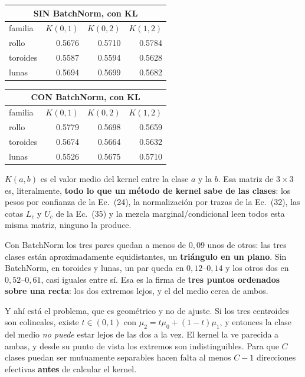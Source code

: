 \documentclass[11pt,a4paper]{article}
\begin{document}
\noindent
\begin{minipage}[t]{0.49\textwidth}
  \centering
  \footnotesize\setlength{\tabcolsep}{3pt}
  \begin{tabular}{lrrr}
      \multicolumn{4}{c}{\textbf{SIN BatchNorm, con KL}} \\[2pt]
      \toprule
      familia & $K(0,1)$ & $K(0,2)$ & $K(1,2)$ \\
      \midrule
      rollo & 0.5676 & 0.5710 & 0.5784 \\
      toroides & 0.5587 & 0.5594 & 0.5628 \\
      lunas & 0.5694 & 0.5699 & 0.5682 \\
      \bottomrule
    \end{tabular}
\end{minipage}\hfill
\begin{minipage}[t]{0.49\textwidth}
  \centering
  \footnotesize\setlength{\tabcolsep}{3pt}
  \begin{tabular}{lrrr}
      \multicolumn{4}{c}{\textbf{CON BatchNorm, con KL}} \\[2pt]
      \toprule
      familia & $K(0,1)$ & $K(0,2)$ & $K(1,2)$ \\
      \midrule
      rollo & 0.5779 & 0.5698 & 0.5659 \\
      toroides & 0.5674 & 0.5664 & 0.5632 \\
      lunas & 0.5526 & 0.5675 & 0.5710 \\
      \bottomrule
    \end{tabular}
\end{minipage}
\vspace{11pt}


$K(a,b)$ es el valor medio del kernel entre la clase $a$ y la $b$. Esa matriz de
$3\times 3$ es, literalmente, \textbf{todo lo que un método de kernel sabe de las
clases}: los pesos por confianza de la Ec.~(24), la normalización por trazas de la
Ec.~(32), las cotas $L_c$ y $U_c$ de la Ec.~(35) y la mezcla marginal/condicional
leen todos esta misma matriz, ninguno la produce.

Con BatchNorm los tres pares quedan a menos de $0{,}09$ unos de otros: las tres
clases están aproximadamente equidistantes, un \textbf{triángulo en un plano}. Sin
BatchNorm, en toroides y lunas, un par queda en $0{,}12$--$0{,}14$ y los otros dos
en $0{,}52$--$0{,}61$, casi iguales entre sí. Esa es la firma de \textbf{tres
puntos ordenados sobre una recta}: los dos extremos lejos, y el del medio cerca de
ambos.

Y ahí está el problema, que es geométrico y no de ajuste. Si los tres centroides
son colineales, existe $t \in (0,1)$ con $\mu_2 = t\mu_0 + (1-t)\mu_1$, y entonces
la clase del medio \emph{no puede} estar lejos de las dos a la vez. El kernel la ve
parecida a ambas, y desde su punto de vista los extremos son indistinguibles. Para
que $C$ clases puedan ser mutuamente separables hacen falta al menos $C-1$
direcciones efectivas \textbf{antes} de calcular el kernel.
\end{document}
